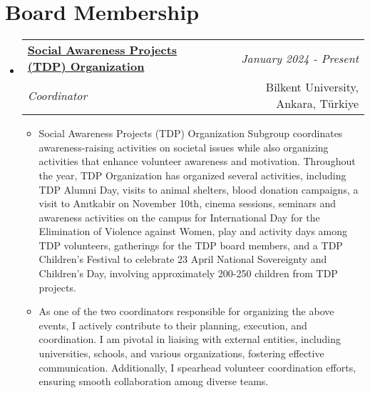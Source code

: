 \documentclass[a4paper,11pt]{article}
\makeatletter
\newcommand{\resumeSubheading}[4]{
\vspace{0.5mm}\item
    \begin{tabular*}{0.98\textwidth}[t]{l@{\extracolsep{\fill}}r}
    \textbf{#1} & \textit{\footnotesize{#4}} \\
    \textit{\footnotesize{#3}} &  \footnotesize{#2} \\
    \end{tabular*}\vspace{-2.4mm}
}
\newcommand{\resumeSubHeadingListStart}{\begin{itemize}[leftmargin=*,labelsep=0mm]}
\newcommand{\resumeItemListStart}{\begin{justify}\begin{itemize}[leftmargin=3ex, rightmargin=2ex, noitemsep,labelsep=1.2mm,itemsep=0mm]\small}
\newcommand{\resumeSubHeadingListEnd}{\end{itemize}\vspace{2mm}}
\newcommand{\resumeItemListEnd}{\end{itemize}\end{justify}\vspace{-2mm}}
\makeatother
\begin{document}

\section{\textbf{Board Membership}}
    \resumeSubHeadingListStart
        \resumeSubheading
            {\href{https://w3.bilkent.edu.tr/www/ogrenci-dekanligi/toplumsal-duyarlilik-projeleri/}{Social Awareness Projects (TDP) Organization}}{Bilkent University, Ankara, Türkiye}
            {Coordinator}{January 2024 - Present}
                \resumeItemListStart
                    \item Social Awareness Projects (TDP) Organization Subgroup coordinates awareness-raising activities on societal issues while also organizing activities that enhance volunteer awareness and motivation. Throughout the year, TDP Organization has organized several activities, including TDP Alumni Day, visits to animal shelters, blood donation campaigns, a visit to Anıtkabir on November 10th, cinema sessions, seminars and awareness activities on the campus for International Day for the Elimination of Violence against Women, play and activity days among TDP volunteers, gatherings for the TDP board members, and a TDP Children’s Festival to celebrate 23 April National Sovereignty and Children's Day, involving approximately 200-250 children from TDP projects.
                    \item As one of the two coordinators responsible for organizing the above events, I actively contribute to their planning, execution, and coordination. I am pivotal in liaising with external entities, including universities, schools, and various organizations, fostering effective communication. Additionally, I spearhead volunteer coordination efforts, ensuring smooth collaboration among diverse teams.
                \resumeItemListEnd
    \resumeSubHeadingListEnd
\vspace{-6.5mm}

\end{document}
